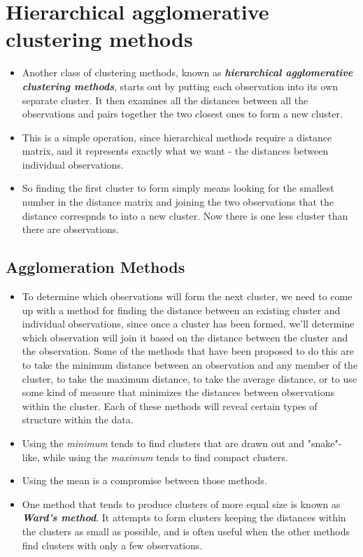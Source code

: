 \documentclass[SKLCluster.tex]{subfiles}
\begin{document}
\section{Hierarchical agglomerative clustering methods}
\begin{itemize}
\item Another class of clustering methods, known as \textbf{\textit{hierarchical agglomerative clustering methods}}, starts out by putting each observation into its own separate cluster. It then examines all the distances between all the observations and pairs together the two closest ones to form a new cluster. 
\item This is a simple operation, since hierarchical methods require a distance matrix, and it represents exactly what we want - the distances between individual observations. 
\item So finding the first cluster to form simply means looking for the smallest number in the distance matrix and joining the two observations that the distance correspnds to into a new cluster. Now there is one less cluster than there are observations. 
\end{itemize}
\subsection{Agglomeration Methods}
\begin{itemize}
\item To determine which observations will form the next cluster, we need to come up with a method for finding the distance between an existing cluster and individual observations, since once a cluster has been formed, we'll determine which observation will join it based on the distance between the cluster and the observation. Some of the methods that have been proposed to do this are to take the minimum distance between an observation and any member of the cluster, to take the maximum distance, to take the average distance, or to use some kind of measure that minimizes the distances between observations within the cluster. Each of these methods will reveal certain types of structure within the data. \item Using the \textit{minimum} tends to find clusters that are drawn out and "snake"-like, while using the \textit{maximum} tends to find compact clusters. 
\item Using the mean is a compromise between those methods.
\item One method that tends to produce clusters of more equal size is known as \textbf{\textit{Ward's method}}. It attempts to form clusters keeping the distances within the clusters as small as possible, and is often useful when the other methods find clusters with only a few observations. 

\end{itemize}
\end{document}
